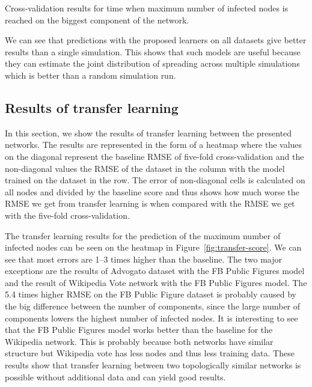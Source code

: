 \documentclass{article}
\begin{document}
\begin{table*}[t!]
    \centering
	\caption{Cross-validation results for time when maximum number of infected nodes is reached on the biggest component of the network.}    \resizebox{\columnwidth}{!}{
	}
	\label{tab:time-biggest}
\end{table*}

We can see that predictions with the proposed learners on all datasets give better results than a single simulation. This shows that such models are useful because they can estimate the joint distribution of spreading across multiple simulations which is better than a random simulation run.

\subsection{Results of transfer learning}
\label{sec:transfer-results}
In this section, we show the results of transfer learning between the presented networks. The results are represented in the form of a heatmap where the values on the diagonal represent the baseline RMSE of five-fold cross-validation and the non-diagonal values the RMSE of the dataset in the column with the model trained on the dataset in the row. The error of non-diagonal cells is calculated on all nodes and divided by the baseline score and thus shows how much worse the RMSE we get from transfer learning is when compared with the RMSE we get with the five-fold cross-validation.

The transfer learning results for the prediction of the maximum number of infected nodes can be seen on the heatmap in  Figure~\ref{fig:transfer-score}. We can see that most errors are 1--3 times higher than the baseline. The two major exceptions are the results of Advogato dataset with the FB Public Figures model and the result of Wikipedia Vote network with the FB Public Figures model. The 5.4 times higher RMSE on the FB Public Figure dataset is probably caused by the big difference between the number of components, since the large number of components lowers the highest number of infected nodes. It is interesting to see that the FB Public Figures model works better than the baseline for the Wikipedia network. This is probably because both networks have similar structure but Wikipedia vote has less nodes and thus less training data. These results show that transfer learning between two topologically similar networks is possible without additional data and can yield good results.
\end{document}
